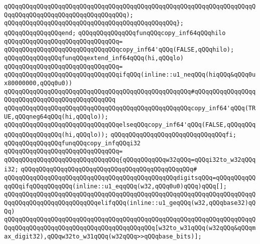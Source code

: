 \verb|qQQqqQQqqQQqqQQqqQQqqQQqqQQqqQQqqQQqqQQqqQQqqQQqqQQqqQQqqQQqqQQqqQQqqQQqqQQqqQQqqQQqqQQqqQQqqQQqqQQqqQQq);|\newline
\verb|qQQqqQQqqQQqqQQqqQQqqQQqqQQqqQQqqQQqqQQqqQQqqQQq};|\newline
\verb|qQQqqQQqqQQqqQQqend;|\newline
\newline
\verb|qQQqqQQqqQQqqQQqfunqQQqcopy_inf64qQQqhilo|\newline
\verb|qQQqqQQqqQQqqQQqqQQqqQQqqQQqqQQq=|\newline
\verb|qQQqqQQqqQQqqQQqqQQqqQQqqQQqqQQqcopy_inf64'qQQq(FALSE,qQQqhilo);|\newline
\newline
\verb|qQQqqQQqqQQqqQQqfunqQQqextend_inf64qQQq(hi,qQQqlo)|\newline
\verb|qQQqqQQqqQQqqQQqqQQqqQQqqQQqqQQq=|\newline
\verb|qQQqqQQqqQQqqQQqqQQqqQQqqQQqqQQqifqQQq(inline::u1_neqQQq(hiqQQq&qQQq0ux80000000,qQQq0u0))|\newline
\verb|qQQqqQQqqQQqqQQqqQQqqQQqqQQqqQQqqQQqqQQqqQQqqQQqqQQq#qQQqqQQqqQQqqQQqqQQqqQQqqQQqqQQqqQQqqQQqqQQqqQQq|\newline
\verb|qQQqqQQqqQQqqQQqqQQqqQQqqQQqqQQqqQQqqQQqqQQqqQQqqQQqcopy_inf64'qQQq(TRUE,qQQqneg64qQQq(hi,qQQqlo));|\newline
\verb|qQQqqQQqqQQqqQQqqQQqqQQqqQQqqQQqelseqQQqcopy_inf64'qQQq(FALSE,qQQqqQQqqQQqqQQqqQQqqQQq(hi,qQQqlo));|\newline
\verb|qQQqqQQqqQQqqQQqqQQqqQQqqQQqqQQqfi;|\newline
\newline
\verb|qQQqqQQqqQQqqQQqfunqQQqcopy_infqQQqi32|\newline
\verb|qQQqqQQqqQQqqQQqqQQqqQQqqQQqqQQq=|\newline
\verb|qQQqqQQqqQQqqQQqqQQqqQQqqQQqqQQq{qQQqqQQqqQQqw32qQQq=qQQqi32to_w32qQQqi32;|\newline
\verb|qQQqqQQqqQQqqQQqqQQqqQQqqQQqqQQqqQQqqQQqqQQqqQQq#|\newline
\verb|qQQqqQQqqQQqqQQqqQQqqQQqqQQqqQQqqQQqqQQqqQQqqQQqdigitsqQQq=qQQqqQQqqQQqqQQqifqQQqqQQqqQQq(inline::u1_eqqQQq(w32,qQQq0u0)qQQq)qQQq[];|\newline
\verb|qQQqqQQqqQQqqQQqqQQqqQQqqQQqqQQqqQQqqQQqqQQqqQQqqQQqqQQqqQQqqQQqqQQqqQQqqQQqqQQqqQQqqQQqqQQqqQQqelifqQQq(inline::u1_geqQQq(w32,qQQqbase32)qQQq)|\newline
\verb|qQQqqQQqqQQqqQQqqQQqqQQqqQQqqQQqqQQqqQQqqQQqqQQqqQQqqQQqqQQqqQQqqQQqqQQqqQQqqQQqqQQqqQQqqQQqqQQqqQQqqQQqqQQqqQQq[w32to_w31qQQq(w32qQQq&qQQqmax_digit32),qQQqw32to_w31qQQq(w32qQQq>>qQQqbase_bits)];|\newline
